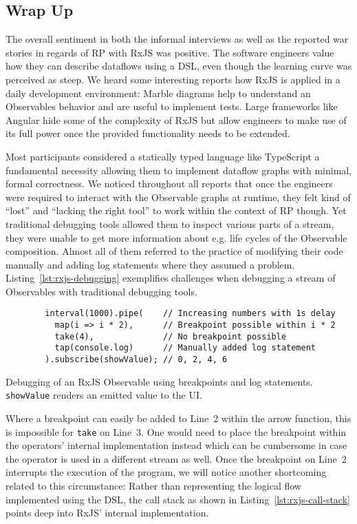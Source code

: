 \documentclass[12pt,a4paper]{article}
\begin{document}
\subsection{Wrap Up}

The overall sentiment in both the informal interviews as well as the reported war stories in regards of RP with RxJS was positive. The software engineers value how they can describe dataflows using a DSL, even though the learning curve was perceived as steep. We heard some interesting reports how RxJS is applied in a daily development environment: Marble diagrams help to understand  an Observables behavior and are useful to implement tests. Large frameworks like Angular hide some of the complexity of RxJS but allow engineers to make use of its full power once the provided functionality needs to be extended.

Most participants considered a statically typed language like TypeScript a fundamental necessity allowing them to implement dataflow graphs with minimal, formal correctness. We noticed throughout all reports that once the engineers were required to interact with the Observable graphs at runtime, they felt kind of ``lost'' and ``lacking the right tool'' to work within the context of RP though. Yet traditional debugging tools allowed them to inspect various parts of a stream, they were unable to get more information about e.g. life cycles of the Observable composition. Almost all of them referred to the practice of modifying their code manually and adding log statements where they assumed a problem. Listing~\ref{lst:rxjs-debugging} exemplifies challenges when debugging a stream of Observables with traditional debugging tools.

\begin{listing}[H]
	\begin{verbatim}
		interval(1000).pipe(    // Increasing numbers with 1s delay
		  map(i => i * 2),      // Breakpoint possible within i * 2
		  take(4),              // No breakpoint possible
		  tap(console.log)      // Manually added log statement
		).subscribe(showValue); // 0, 2, 4, 6
	\end{verbatim}
	\caption{Debugging of an RxJS Observable using breakpoints and log statements. \texttt{showValue} renders an emitted value to the UI.}
	\label{lst:rxjs-debugging}
\end{listing}

Where a breakpoint can easily be added to Line~2 within the arrow function, this is impossible for \texttt{take} on Line~3. One would need to place the breakpoint within the operators' internal implementation instead which can be cumbersome in case the operator is used in a different stream as well. Once the breakpoint on Line~2 interrupts the execution of the program, we will notice another shortcoming related to this circumstance: Rather than representing the logical flow implemented using the DSL, the call stack as shown in Listing~\ref{lst:rxjs-call-stack} points deep into RxJS' internal implementation.
\end{document}
